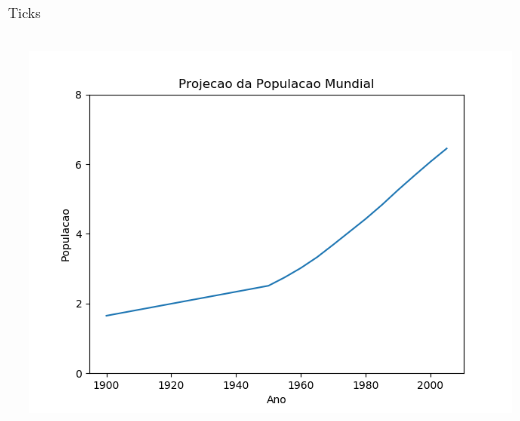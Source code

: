 \begin{frame}{Ticks}
  \begin{columns}
    \begin{column}{0.55\textwidth}
          
    \end{column}

    \begin{column}{0.45\textwidth}
      \begin{center}
        \includegraphics[scale=.35]{aula-2/figuras/matplotlib-customization-4.png}
      \end{center}
    \end{column}
  \end{columns}
  
  \framebreak
  
  \begin{columns}
    \begin{column}{0.55\textwidth}
          
    \end{column}


\end{columns}
\end{frame}
